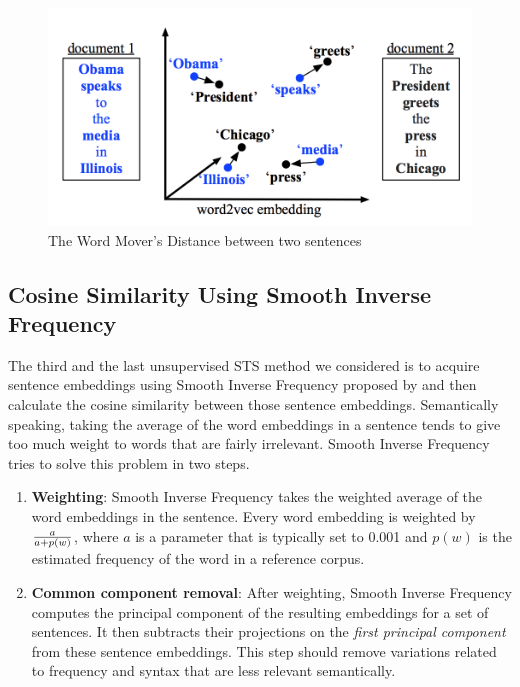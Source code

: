 \begin{figure}[ht]
	\centering
	\includegraphics[scale=0.4]{figures/semantic_textual_similarity/state_of_the_art/word_movers_distance.png}
	\caption[The Word Mover's Distance between two sentences]{The Word Mover's Distance between two sentences \autocite{10.5555/3045118.3045221}}
	\label{fig:WMD}
\end{figure}

\subsection{Cosine Similarity Using Smooth Inverse Frequency}
The third and the last unsupervised STS method we considered is to acquire sentence embeddings using Smooth Inverse Frequency proposed by \textcite{DBLP:conf/iclr/AroraLM17} and then calculate the cosine similarity between those sentence embeddings. Semantically speaking, taking the average of the word embeddings in a sentence tends to give too much weight to words that are fairly irrelevant. Smooth Inverse Frequency tries to solve this problem in two steps. 

\begin{enumerate}
	\item \textbf{Weighting}: Smooth Inverse Frequency takes the weighted average of the word embeddings in the sentence. Every word embedding is weighted by $a\over{a + p(w)}$, where $a$ is a parameter that is typically set to 0.001 and $p(w)$ is the estimated frequency of the word in a reference corpus. 
	\item \textbf{Common component removal}: After weighting, Smooth Inverse Frequency computes the principal component of the resulting embeddings for a set of sentences. It then subtracts their projections on the \textit{first principal component} from these sentence embeddings. This step should remove variations related to frequency and syntax that are less relevant semantically.
\end{enumerate}

